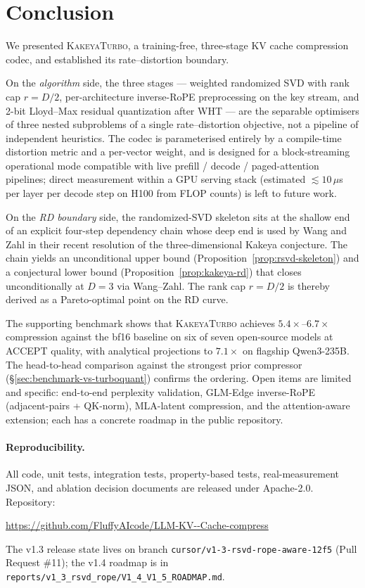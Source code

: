\documentclass[11pt,a4paper]{article}
\theoremstyle{definition}
\theoremstyle{plain}
\begin{document}
\section{Conclusion}
\label{sec:conclusion}

We presented \textsc{KakeyaTurbo}, a training-free, three-stage KV cache compression codec, and established its rate--distortion boundary.

On the \emph{algorithm} side, the three stages --- weighted randomized SVD with rank cap $r = D/2$, per-architecture inverse-RoPE preprocessing on the key stream, and 2-bit Lloyd--Max residual quantization after WHT --- are the separable optimisers of three nested subproblems of a single rate--distortion objective, not a pipeline of independent heuristics. The codec is parameterised entirely by a compile-time distortion metric and a per-vector weight, and is designed for a block-streaming operational mode compatible with live prefill / decode / paged-attention pipelines; direct measurement within a GPU serving stack (estimated $\lesssim 10\,\mu$s per layer per decode step on H100 from FLOP counts) is left to future work.

On the \emph{RD boundary} side, the randomized-SVD skeleton sits at the shallow end of an explicit four-step dependency chain whose deep end is used by Wang and Zahl in their recent resolution of the three-dimensional Kakeya conjecture. The chain yields an unconditional upper bound (Proposition~\ref{prop:rsvd-skeleton}) and a conjectural lower bound (Proposition~\ref{prop:kakeya-rd}) that closes unconditionally at $D = 3$ via Wang--Zahl. The rank cap $r = D/2$ is thereby derived as a Pareto-optimal point on the RD curve.

The supporting benchmark shows that \textsc{KakeyaTurbo} achieves $5.4\times$--$6.7\times$ compression against the bf16 baseline on six of seven open-source models at ACCEPT quality, with analytical projections to $7.1\times$ on flagship Qwen3-235B. The head-to-head comparison against the strongest prior compressor (\S\ref{sec:benchmark-vs-turboquant}) confirms the ordering. Open items are limited and specific: end-to-end perplexity validation, GLM-Edge inverse-RoPE (adjacent-pairs + QK-norm), MLA-latent compression, and the attention-aware extension; each has a concrete roadmap in the public repository.

\paragraph{Reproducibility.} All code, unit tests, integration tests, property-based tests, real-measurement JSON, and ablation decision documents are released under Apache-2.0. Repository:
\begin{center}
\url{https://github.com/FluffyAIcode/LLM-KV--Cache-compress}
\end{center}
The v1.3 release state lives on branch \texttt{cursor/v1-3-rsvd-rope-aware-12f5} (Pull Request \#11); the v1.4 roadmap is in \texttt{reports/v1\_3\_rsvd\_rope/V1\_4\_V1\_5\_ROADMAP.md}.
\end{document}
